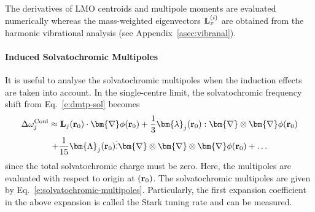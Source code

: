 \documentclass[b5paper,oneside,fleqn,11pt]{book}
\newcommand{\BM}[1]{\bm{#1}}
\begin{document}
\begin{refsection}
The derivatives of LMO centroids and multipole moments are evaluated numerically whereas 
the mass\hyp{}weighted eigenvectors
${\bf L}_x^{(i)}$ 
are obtained from the harmonic vibrational analysis (see Appendix~\ref{asec:vibranal}).

\paragraph{Induced Solvatochromic Multipoles\label{p:solindmult}}
It is useful to analyse the solvatochromic multipoles 
when the induction effects are taken into account.
In the single\hyp{}centre limit, the solvatochromic
frequency shift from Eq.~\eqref{e:dmtp-sol}
becomes
%
\begin{multline} \label{e:dmtp-solmmm}
 \Delta\omega_j^{\rm Coul} \approx  
                        {\bf L}_j({\bf r}_0) \cdot {\BM \nabla} \phi({\bf r}_0)   + 
      \frac{1}{3} {\BM \lambda}_j({\bf r}_0) : {\BM \nabla} \otimes {\BM \nabla} \phi({\bf r}_0)   \\ + 
     \frac{1}{15} {\BM \Lambda}_j({\bf r}_0) \vdots {\BM \nabla} \otimes {\BM \nabla} \otimes {\BM \nabla} \phi({\bf r}_0) + \ldots
\end{multline}
%
since the total solvatochromic charge must be zero. Here, the multipoles
are evaluated with respect to origin at $({\bf r}_0)$.
The solvatochromic multipoles are given by Eq.~\eqref{e:solvatochromic-multipoles}.
Particularly, the first expansion coefficient in the above expansion
is called the Stark tuning rate and can be measured.


\end{refsection}
\end{document}

